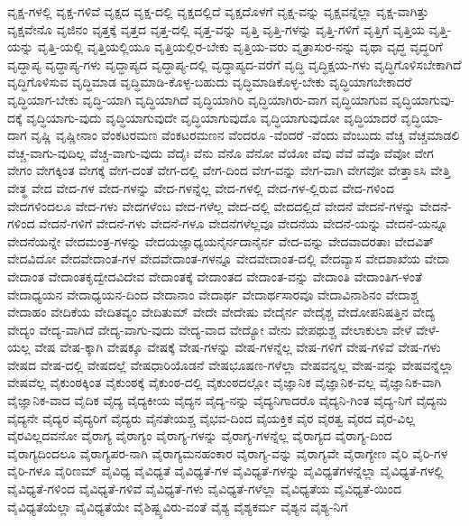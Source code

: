 {ವೃಕ್ಷ-ಗಳಲ್ಲಿ
ವೃಕ್ಷ-ಗಳಿವೆ
ವೃಕ್ಷದ
ವೃಕ್ಷ-ದಲ್ಲಿ
ವೃಕ್ಷದಲ್ಲಿದೆ
ವೃಕ್ಷದೊಳಗೆ
ವೃಕ್ಷ-ವನ್ನು
ವೃಕ್ಷವನ್ನೆಲ್ಲಾ
ವೃಕ್ಷ-ವಾಗಿತ್ತು
ವೃಕ್ಷವೇನೊ
ವೃಜಿನಂ
ವೃತ್ತಕ್ಕೆ
ವೃತ್ತದ
ವೃತ್ತ-ದಲ್ಲಿ
ವೃತ್ತ-ವನ್ನು
ವೃತ್ತಿ
ವೃತ್ತಿ-ಗಳನ್ನು
ವೃತ್ತಿ-ಗಳಿಗೆ
ವೃತ್ತಿಗೆ
ವೃತ್ತಿಯ
ವೃತ್ತಿ-ಯನ್ನು
ವೃತ್ತಿ-ಯಲ್ಲಿ
ವೃತ್ತಿಯಲ್ಲಿಯೂ
ವೃತ್ತಿಯಲ್ಲಿರ-ಬೇಕು
ವೃತ್ತಿಯ-ವರು
ವೃತ್ರಾಸುರ-ನನ್ನು
ವೃಥಾ
ವೃದ್ಧ
ವೃದ್ಧರಿಗೆ
ವೃದ್ಧಾಪ್ಯ
ವೃದ್ಧಾಪ್ಯ-ಗಳು
ವೃದ್ಧಾಪ್ಯದ
ವೃದ್ಧಾಪ್ಯ-ದಲ್ಲಿ
ವೃದ್ಧಾಪ್ಯದ-ವರೆಗೆ
ವೃದ್ಧಿ
ವೃದ್ಧಿಕ್ಷಯ-ಗಳು
ವೃದ್ಧಿಗೊಳಿಸಬೇಕಾಗಿದೆ
ವೃದ್ಧಿಗೊಳಿಸುವ
ವೃದ್ಧಿಮಾಡ
ವೃದ್ಧಿಮಾಡಿ-ಕೊಳ್ಳ-ಬಹುದು
ವೃದ್ಧಿಮಾಡಿಕೊಳ್ಳ-ಬೇಕು
ವೃದ್ಧಿಯಾಗಬೇಕಾದರೆ
ವೃದ್ಧಿಯಾಗ-ಬೇಕು
ವೃದ್ಧಿ-ಯಾಗಿ
ವೃದ್ಧಿಯಾಗಿದೆ
ವೃದ್ಧಿಯಾಗಿರಿ
ವೃದ್ಧಿಯಾಗಿರು-ವಾಗ
ವೃದ್ಧಿಯಾಗುವ
ವೃದ್ಧಿಯಾಗುವು-ದಕ್ಕೆ
ವೃದ್ಧಿಯಾಗು-ವುದು
ವೃದ್ಧಿಯಾಗುವುದೇ
ವೃದ್ಧಿಯಾಗುವುದೊ
ವೃದ್ಧಿಯಾಗುವುದೋ
ವೃದ್ಧಿಯಾದರೆ
ವೃದ್ಧಿಯಾ-ದಾಗ
ವೃಷ್ಣಿ
ವೃಷ್ಣೀನಾಂ
ವೆಂಕಟರಮಣ
ವೆಂಕಟರಮಣನ
ವೆಂದರೂ
-ವೆಂದರೆ
-ವೆಂದು
ವೆಂಬುದು
ವೆಚ್ಚ
ವೆಚ್ಚಮಾಡಲಿ
ವೆಚ್ಚ-ವಾಗು-ವುದಿಲ್ಲ
ವೆಚ್ಚ-ವಾಗು-ವುದು
ವೆದೈಃ
ವೆನು
ವೆನೊ
ವೆನೋ
ವೆಯೋ
ವೆವು
ವೆವೆ
ವೆವೊ
ವೆವೋ
ವೇಗ
ವೇಗಂ
ವೇಗಕ್ಕಿಂತ
ವೇಗಕ್ಕೆ
ವೇಗ-ದಂತೆ
ವೇಗ-ದಲ್ಲಿ
ವೇಗ-ದಿಂದ
ವೇಗ-ವನ್ನು
ವೇಗ-ವಾಗಿ
ವೇಗವೋ
ವೇತ್ತಾಽಸಿ
ವೇತ್ತಿ
ವೇತ್ಥ
ವೇದ
ವೇದ-ಗಳ
ವೇದ-ಗಳನ್ನು
ವೇದ-ಗಳನ್ನೆಲ್ಲ
ವೇದ-ಗಳಲ್ಲಿ
ವೇದ-ಗಳ-ಲ್ಲಿರುವ
ವೇದ-ಗಳಿಂದ
ವೇದಗಳಿಂದಲೂ
ವೇದ-ಗಳು
ವೇದಗಳೆಂಬ
ವೇದ-ಗಳೆಲ್ಲ
ವೇದ-ದಲ್ಲಿ
ವೇದದಲ್ಲಿದೆ
ವೇದನೆ
ವೇದನೆ-ಗಳನ್ನು
ವೇದನೆ-ಗಳಿಂದ
ವೇದನೆ-ಗಳಿಗೆ
ವೇದನೆ-ಗಳು
ವೇದನೆ-ಗಳೂ
ವೇದನೆಗಳೆಲ್ಲವೂ
ವೇದನೆಯ
ವೇದನೆ-ಯನ್ನು
ವೇದನೆ-ಯನ್ನೂ
ವೇದನೆಯನ್ನೇ
ವೇದಮಂತ್ರ-ಗಳನ್ನು
ವೇದಯಜ್ಞಾಧ್ಯಯನೈರ್ನದಾನೈರ್ನ
ವೇದ-ವನ್ನು
ವೇದವಾದರತಾಃ
ವೇದವಿತ್
ವೇದವಿದೋ
ವೇದವೇದಾಂತ-ಗಳ
ವೇದವೇದಾಂತ-ಗಳನ್ನೂ
ವೇದವೇದಾಂತ-ದಲ್ಲಿ
ವೇದವ್ಯಾಸ
ವೇದಶಾಖೆಯ
ವೇದಾ
ವೇದಾಂತ
ವೇದಾಂತಕೃದ್ವೇದವಿದೇವ
ವೇದಾಂತಕ್ಕೆ
ವೇದಾಂತದ
ವೇದಾಂತ-ವನ್ನು
ವೇದಾಂತಿ
ವೇದಾಂತಿಗ-ಳಂತೆ
ವೇದಾಧ್ಯಯನ
ವೇದಾಧ್ಯಯನ-ದಿಂದ
ವೇದಾನಾಂ
ವೇದಾರ್ಥ
ವೇದಾರ್ಥಸಾರವೂ
ವೇದಾವಿನಾಶಿನಂ
ವೇದಾಶ್ಚ
ವೇದಾಹಂ
ವೇದಿಕೆಯ
ವೇದಿತವ್ಯಂ
ವೇದಿತುಮ್
ವೇದೇ
ವೇದೇಷು
ವೇದೈರ್ನ
ವೇದೈಶ್ಚ
ವೇದೋಪನಿಷತ್ತಿನ
ವೇದ್ಯ
ವೇದ್ಯಂ
ವೇದ್ಯ-ವಾಗಿದೆ
ವೇದ್ಯ-ವಾಗು-ವುದು
ವೇದ್ಯ-ವಾದ
ವೇದ್ಯೋ
ವೇನು
ವೇಪಥುಶ್ಚ
ವೇಲಾಕುಲಾ
ವೇಳೆ
ವೇಳೆ-ಯಲ್ಲ
ವೇಷ
ವೇಷ-ಕ್ಕಾಗಿ
ವೇಷಕ್ಕೂ
ವೇಷಕ್ಕೆ
ವೇಷ-ಗಳನ್ನು
ವೇಷ-ಗಳನ್ನೆಲ್ಲ
ವೇಷ-ಗಳಿಗೆ
ವೇಷ-ಗಳಿವೆ
ವೇಷ-ಗಳು
ವೇಷದ
ವೇಷ-ದಲ್ಲಿ
ವೇಷದಲ್ಲೆ
ವೇಷಧಾರಿಯೊಡನೆ
ವೇಷಭೂಷಣ-ಗಳೆಲ್ಲಾ
ವೇಷವನ್ನಲ್ಲ
ವೇಷ-ವನ್ನು
ವೇಷವನ್ನೆಲ್ಲಾ
ವೇಷವೆಲ್ಲ
ವೈಕುಂಠಕ್ಕಿಂತ
ವೈಕುಂಠಕ್ಕೆ
ವೈಕುಂಠ-ದಲ್ಲಿ
ವೈಕುಂಠದಲ್ಲೋ
ವೈಜ್ಞಾನಿಕ
ವೈಜ್ಞಾನಿಕ-ವಲ್ಲ
ವೈಜ್ಞಾನಿಕ-ವಾಗಿ
ವೈಜ್ಞಾನಿಕ-ವಾದ
ವೈದಿಕ
ವೈದ್ಯ
ವೈದ್ಯಕೀಯ
ವೈದ್ಯನ
ವೈದ್ಯ-ನನ್ನು
ವೈದ್ಯನಿಗಾದರೊ
ವೈದ್ಯನಿ-ಗಿಂತ
ವೈದ್ಯ-ನಿಗೆ
ವೈದ್ಯನು
ವೈದ್ಯನೇ
ವೈದ್ಯರ
ವೈದ್ಯರಿಗೆ
ವೈದ್ಯರು
ವೈನತೇಯಶ್ಚ
ವೈಭವ-ದಿಂದ
ವೈಯಕ್ತಿಕ
ವೈರ
ವೈರತ್ವ
ವೈರದ
ವೈರ-ವಿಲ್ಲ
ವೈರವಿಲ್ಲದವನೋ
ವೈರಾಗ್ಯ
ವೈರಾಗ್ಯಂ
ವೈರಾಗ್ಯ-ಗಳನ್ನು
ವೈರಾಗ್ಯ-ಗಳನ್ನೆಲ್ಲ
ವೈರಾಗ್ಯದ
ವೈರಾಗ್ಯ-ದಿಂದ
ವೈರಾಗ್ಯದಿಂದಲೂ
ವೈರಾಗ್ಯಪರ-ನಾಗಿ
ವೈರಾಗ್ಯಮನಹಂಕಾರ
ವೈರಾಗ್ಯ-ವನ್ನು
ವೈರಾಗ್ಯವೇ
ವೈರಾಗ್ಯೇಣ
ವೈರಿ
ವೈರಿ-ಗಳ
ವೈರಿ-ಗಳೂ
ವೈರಿಣಮ್
ವೈವಿಧ್ಯ
ವೈವಿಧ್ಯತೆ
ವೈವಿಧ್ಯತೆ-ಗಳ
ವೈವಿಧ್ಯತೆ-ಗಳನ್ನು
ವೈವಿಧ್ಯತೆಗಳನ್ನೆಲ್ಲಾ
ವೈವಿಧ್ಯತೆ-ಗಳಲ್ಲಿ
ವೈವಿಧ್ಯತೆ-ಗಳಿಂದ
ವೈವಿಧ್ಯತೆ-ಗಳಿವೆ
ವೈವಿಧ್ಯತೆ-ಗಳು
ವೈವಿಧ್ಯತೆ-ಗಳೆಲ್ಲಾ
ವೈವಿಧ್ಯತೆಯ
ವೈವಿಧ್ಯತೆ-ಯಿಂದ
ವೈವಿಧ್ಯತೆಯೆಲ್ಲಾ
ವೈವಿಧ್ಯತೆಯೇ
ವೈಶಿಷ್ಟ್ಯವಿರು-ವಂತೆ
ವೈಶ್ಯ
ವೈಶ್ಯಕರ್ಮ
ವೈಶ್ಯನ
ವೈಶ್ಯ-ನಿಗೆ
}
